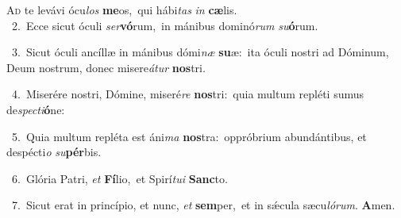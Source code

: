 \lettrine{\initial\textcolor{\initialcolor}{A}}{d} te levávi ócu\textit{los} \textbf{me}\-os,~\star qui hábi\textit{tas} \textit{in} \textbf{cæ}\-lis.\\
{\numbfont\textcolor{\numbcolor}{~2.}}~Ecce sicut óculi \textit{ser}\-\textbf{vó}rum,~\star in mánibus dominó\textit{rum} \textit{su}\-\textbf{ó}rum.\par
{\numbfont\textcolor{\numbcolor}{~3.}}~Sicut óculi ancíllæ in mánibus dómi\textit{næ} \textbf{su}\-æ:~\star ita óculi nostri ad Dóminum, Deum nostrum, donec misere\-\textit{á}\-\textit{tur} \textbf{nos}\-tri.\par
{\numbfont\textcolor{\numbcolor}{~4.}}~Miserére nostri, Dómine, miseré\textit{re} \textbf{nos}\-tri:~\star quia multum repléti sumus de\-\textit{spec}\-\textit{ti}\textbf{ó}ne:\par
{\numbfont\textcolor{\numbcolor}{~5.}}~Quia multum repléta est áni\textit{ma} \textbf{nos}\-tra:~\star oppróbrium abundántibus, et despécti\textit{o} \textit{su}\-\textbf{pér}bis.\par
{\numbfont\textcolor{\numbcolor}{~6.}}~Glória Patri, \textit{et} \textbf{Fí}\-lio,~\star et Spirí\-\textit{tu}\-\textit{i} \textbf{Sanc}\-to.\par
{\numbfont\textcolor{\numbcolor}{~7.}}~Sicut erat in princípio, et nunc, \textit{et} \textbf{sem}\-per,~\star et in sǽcula sæcu\-\textit{ló}\-\textit{rum}. \textbf{A}\-men.\par
